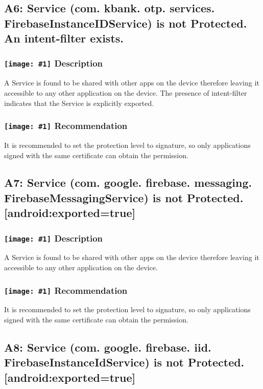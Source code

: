 \documentclass[12p]{article}
\newcommand{\icon}[1]{\texttt{[image: \#1]}}
\begin{document}
\subsection{A6: Service (com. kbank. otp. services. FirebaseInstanceIDService) is not Protected. An intent-filter exists.}
\subsubsection*{\protect\icon{/home/miki/Documents/GITHUB/AndroidPermissions/python/vulns/report_icons/basic_sheet.png} Description}
A  Service is found to be shared with other apps on the device therefore leaving it accessible to any other application on the device. The presence of intent-filter indicates that the Service is explicitly exported.
\subsubsection*{\protect\icon{/home/miki/Documents/GITHUB/AndroidPermissions/python/vulns/report_icons/basic_todo.png} Recommendation}
It is recommended to set the protection level to signature, so only applications signed with the same certificate can obtain the permission.
\subsection{A7: Service (com. google. firebase. messaging. FirebaseMessagingService) is not Protected. [android:exported=true]}
\subsubsection*{\protect\icon{/home/miki/Documents/GITHUB/AndroidPermissions/python/vulns/report_icons/basic_sheet.png} Description}
A Service is found to be shared with other apps on the device therefore leaving it accessible to any other application on the device.
\subsubsection*{\protect\icon{/home/miki/Documents/GITHUB/AndroidPermissions/python/vulns/report_icons/basic_todo.png} Recommendation}
It is recommended to set the protection level to signature, so only applications signed with the same certificate can obtain the permission.
\subsection{A8: Service (com. google. firebase. iid. FirebaseInstanceIdService) is not Protected. [android:exported=true]}
\end{document}
